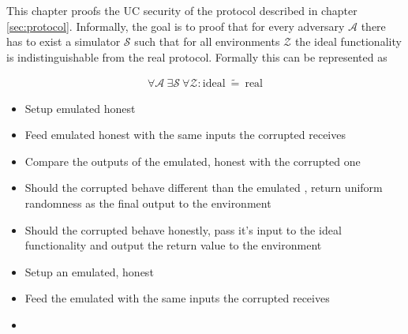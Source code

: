 \label{sec:security}

This chapter proofs the UC \cite{canetti05} security of the protocol described
in chapter \ref{sec:protocol}. Informally, the goal is to proof that for every
adversary $\mathcal{A}$ there has to exist a simulator $\mathcal{S}$ such that
for all environments $\mathcal{Z}$ the ideal functionality is indistinguishable
from the real protocol. Formally this can be represented as

\begin{align*}
%
\forall \mathcal{A}\ \exists \mathcal{S}\ \forall \mathcal{Z} :
\text{ideal}\ \widetilde{=}\ \text{real}
%
\end{align*}

%
%
\label{sec:simulators}


\label{sec:simulator-david}

\begin{itemize}

  \item Setup emulated honest \JWpTwo{}

  \item Feed emulated honest \JWpTwo{} with the same inputs the corrupted
    \JWpTwo{} receives

  \item Compare the outputs of the emulated, honest \JWpTwo{} with the corrupted
    one

  \item Should the corrupted \JWpTwo{} behave different than the emulated
    \JWpTwo{}, return uniform randomness as the final output to the environment

  \item Should the corrupted \JWpTwo{} behave honestly, pass it's input to the
    ideal functionality and output the return value to the environment

\end{itemize}


\label{sec:simulator-goliath}

\begin{itemize}

  \item Setup an emulated, honest \JWpOne{}

  \item Feed the emulated \JWpOne{} with the same inputs the corrupted \JWpOne{}
    receives

  \item

\end{itemize}


